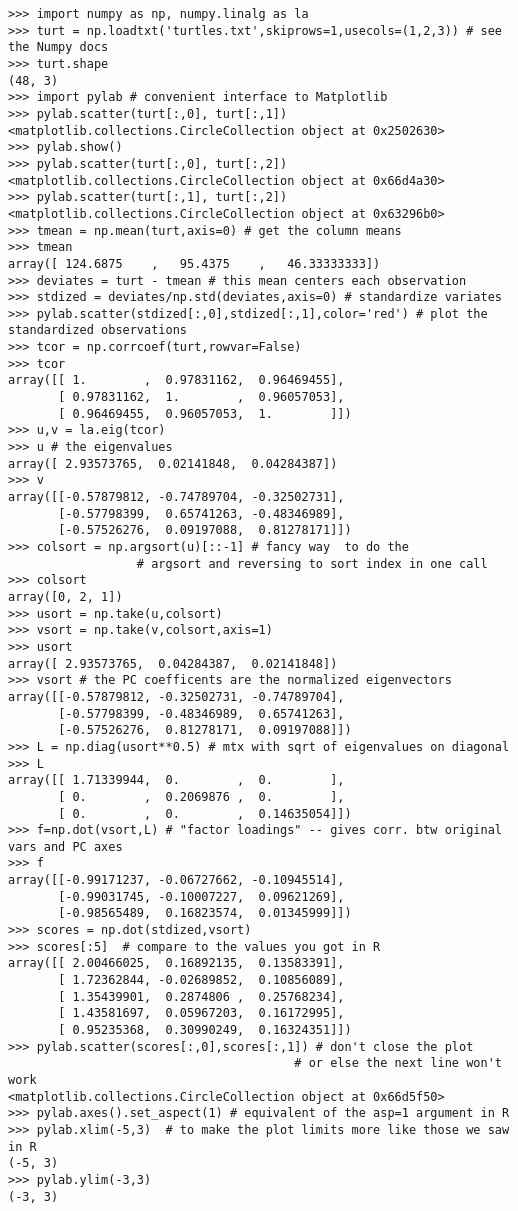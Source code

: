 \documentclass{article}
\begin{document}
\begin{lstlisting}
>>> import numpy as np, numpy.linalg as la
>>> turt = np.loadtxt('turtles.txt',skiprows=1,usecols=(1,2,3)) # see the Numpy docs
>>> turt.shape
(48, 3)
>>> import pylab # convenient interface to Matplotlib
>>> pylab.scatter(turt[:,0], turt[:,1])
<matplotlib.collections.CircleCollection object at 0x2502630>
>>> pylab.show()
>>> pylab.scatter(turt[:,0], turt[:,2])
<matplotlib.collections.CircleCollection object at 0x66d4a30>
>>> pylab.scatter(turt[:,1], turt[:,2])
<matplotlib.collections.CircleCollection object at 0x63296b0>
>>> tmean = np.mean(turt,axis=0) # get the column means
>>> tmean
array([ 124.6875    ,   95.4375    ,   46.33333333])
>>> deviates = turt - tmean # this mean centers each observation
>>> stdized = deviates/np.std(deviates,axis=0) # standardize variates
>>> pylab.scatter(stdized[:,0],stdized[:,1],color='red') # plot the standardized observations
>>> tcor = np.corrcoef(turt,rowvar=False)
>>> tcor
array([[ 1.        ,  0.97831162,  0.96469455],
       [ 0.97831162,  1.        ,  0.96057053],
       [ 0.96469455,  0.96057053,  1.        ]])
>>> u,v = la.eig(tcor)
>>> u # the eigenvalues
array([ 2.93573765,  0.02141848,  0.04284387])
>>> v  
array([[-0.57879812, -0.74789704, -0.32502731],
       [-0.57798399,  0.65741263, -0.48346989],
       [-0.57526276,  0.09197088,  0.81278171]])
>>> colsort = np.argsort(u)[::-1] # fancy way  to do the 
                  # argsort and reversing to sort index in one call
>>> colsort
array([0, 2, 1])
>>> usort = np.take(u,colsort)
>>> vsort = np.take(v,colsort,axis=1)
>>> usort
array([ 2.93573765,  0.04284387,  0.02141848])
>>> vsort # the PC coefficents are the normalized eigenvectors
array([[-0.57879812, -0.32502731, -0.74789704],
       [-0.57798399, -0.48346989,  0.65741263],
       [-0.57526276,  0.81278171,  0.09197088]])
>>> L = np.diag(usort**0.5) # mtx with sqrt of eigenvalues on diagonal
>>> L
array([[ 1.71339944,  0.        ,  0.        ],
       [ 0.        ,  0.2069876 ,  0.        ],
       [ 0.        ,  0.        ,  0.14635054]])
>>> f=np.dot(vsort,L) # "factor loadings" -- gives corr. btw original vars and PC axes
>>> f
array([[-0.99171237, -0.06727662, -0.10945514],
       [-0.99031745, -0.10007227,  0.09621269],
       [-0.98565489,  0.16823574,  0.01345999]])
>>> scores = np.dot(stdized,vsort)
>>> scores[:5]  # compare to the values you got in R
array([[ 2.00466025,  0.16892135,  0.13583391],
       [ 1.72362844, -0.02689852,  0.10856089],
       [ 1.35439901,  0.2874806 ,  0.25768234],
       [ 1.43581697,  0.05967203,  0.16172995],
       [ 0.95235368,  0.30990249,  0.16324351]])
>>> pylab.scatter(scores[:,0],scores[:,1]) # don't close the plot 
                                        # or else the next line won't work
<matplotlib.collections.CircleCollection object at 0x66d5f50>
>>> pylab.axes().set_aspect(1) # equivalent of the asp=1 argument in R
>>> pylab.xlim(-5,3)  # to make the plot limits more like those we saw in R
(-5, 3)
>>> pylab.ylim(-3,3)
(-3, 3)
\end{lstlisting}
\end{document}
